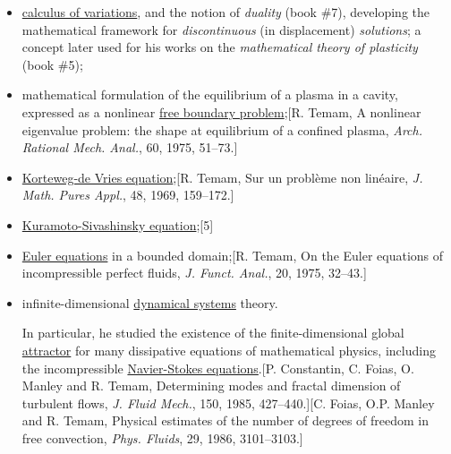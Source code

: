 \documentclass{article}
\begin{document}
\begin{itemize}
	\item \href{https://en.wikipedia.org/wiki/Calculus_of_variations}{calculus of variations}, and the notion of \textit{duality} (book \#7), developing the mathematical framework for \textit{discontinuous} (in displacement) \textit{solutions}; a concept later used for his works on the \textit{mathematical theory of plasticity} (book \#5);
	\item mathematical formulation of the equilibrium of a plasma in a cavity, expressed as a nonlinear \href{https://en.wikipedia.org/wiki/Free_boundary_problem}{free boundary problem};[R. Temam, A nonlinear eigenvalue problem: the shape at equilibrium of a confined plasma, \textit{Arch. Rational Mech. Anal.}, 60, 1975, 51--73.]
	\item \href{https://en.wikipedia.org/wiki/Korteweg-de_Vries_equation}{Korteweg-de Vries equation};[R. Temam, Sur un problème non linéaire, \textit{J. Math. Pures Appl.}, 48, 1969, 159--172.]
	\item \href{https://en.wikipedia.org/wiki/Kuramoto%E2%80%93Sivashinsky_equation}{Kuramoto-Sivashinsky equation};[5]
	\item \href{https://en.wikipedia.org/wiki/Euler_equations}{Euler equations} in a bounded domain;[R. Temam, On the Euler equations of incompressible perfect fluids, \textit{J. Funct. Anal.}, 20, 1975, 32--43.]
	\item infinite-dimensional \href{https://en.wikipedia.org/wiki/Dynamical_systems}{dynamical systems} theory.
	
	In particular, he studied the existence of the finite-dimensional global \href{https://en.wikipedia.org/wiki/Attractor}{attractor} for many dissipative equations of mathematical physics, including the incompressible \href{https://en.wikipedia.org/wiki/Navier-Stokes_equations}{Navier-Stokes equations}.[P. Constantin, C. Foias, O. Manley and R. Temam, Determining modes and fractal dimension of turbulent flows, \textit{J. Fluid Mech.}, 150, 1985, 427--440.][C. Foias, O.P. Manley and R. Temam, Physical estimates of the number of degrees of freedom in free convection, \textit{Phys. Fluids}, 29, 1986, 3101--3103.]
	

\end{itemize}
\end{document}
